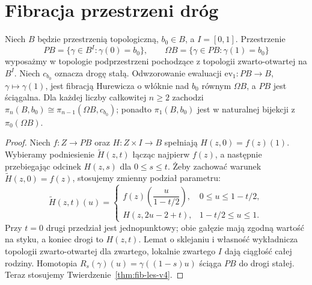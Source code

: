 \section{Fibracja przestrzeni dróg}
\begin{twierdzenie}
Niech $B$ będzie przestrzenią topologiczną, $b_0\in B$,
a $I=[0,1]$. Przestrzenie
\[
 PB=\{\gamma\in B^I:\gamma(0)=b_0\},
 \qquad
 \Omega B=\{\gamma\in PB:\gamma(1)=b_0\}
\]
wyposażmy w topologie podprzestrzeni pochodzące z topologii
zwarto-otwartej na $B^I$. Niech $c_{b_0}$ oznacza drogę stałą.
Odwzorowanie ewaluacji
$\mathrm{ev}_1:PB\to B$, $\gamma\mapsto\gamma(1)$,
jest fibracją Hurewicza o włóknie nad $b_0$ równym
$\Omega B$, a $PB$ jest ściągalna.
Dla każdej liczby całkowitej $n\ge2$ zachodzi
$\pi_n(B,b_0)\cong\pi_{n-1}(\Omega B,c_{b_0})$;
ponadto $\pi_1(B,b_0)$ jest w naturalnej bijekcji z
$\pi_0(\Omega B)$.
\end{twierdzenie}
\begin{proof}
Niech $f:Z\to PB$ oraz $H:Z\times I\to B$ spełniają
$H(z,0)=f(z)(1)$. Wybieramy podniesienie $\widetilde H(z,t)$
łącząc najpierw $f(z)$, a następnie przebiegając odcinek
$H(z,s)$ dla $0\le s\le t$. Żeby zachować warunek
$\widetilde H(z,0)=f(z)$, stosujemy zmienny podział parametru:
\[
\widetilde H(z,t)(u)=
\begin{cases}
f(z)\!\left(\dfrac{u}{1-t/2}\right),&0\le u\le1-t/2,\\[4pt]
H\!\left(z,2u-2+t\right),&1-t/2\le u\le1.
\end{cases}
\]
Przy $t=0$ drugi przedział jest jednopunktowy; obie gałęzie
mają zgodną wartość na styku, a koniec drogi to $H(z,t)$.
Lemat o sklejaniu i własność wykładnicza topologii
zwarto-otwartej dla zwartego, lokalnie zwartego $I$ dają
ciągłość całej rodziny. Homotopia
$R_s(\gamma)(u)=\gamma((1-s)u)$ ściąga $PB$ do drogi stałej.
Teraz stosujemy Twierdzenie~\ref{thm:fib-les-v4}.
\end{proof}

